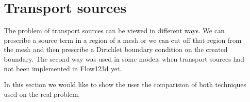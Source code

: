 \section{Transport sources}
The problem of transport sources can be viewed in different ways. We can prescribe a source term in a region of a mesh 
or we can cut off that region from the mesh and then prescribe a Dirichlet boundary condition on the created boundary. 
The second way was used in some models when transport sources had not been implemented in Flow123d yet.

In this section we would like to show the user the comparision of both techniques used on the real problem.

